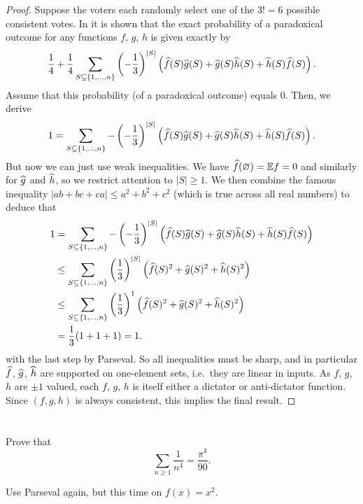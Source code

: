 \begin{proof}
	Suppose the voters each randomly select one of the $3!=6$
	possible consistent votes.
	In  it is shown
	that the exact probability of a paradoxical outcome
	for any functions $f$, $g$, $h$ is given exactly by
	\[ \frac14 + \frac14 \sum_{S \subseteq \{1, \dots, n\}}
		\left( -\frac13 \right)^{\left\lvert S \right\rvert}
		\left( \widehat f(S) \widehat g(S) + \widehat g(S) \widehat h(S) + \widehat h(S) \widehat f(S) \right).
		\]
	Assume that this probability (of a paradoxical outcome) equals $0$.
	Then, we derive
	\[ 1 = \sum_{S \subseteq \{1, \dots, n\}}
		-\left( -\frac13 \right)^{\left\lvert S \right\rvert}
		\left( \widehat f(S) \widehat g(S) + \widehat g(S) \widehat h(S) + \widehat h(S) \widehat f(S) \right). \]
	But now we can just use weak inequalities.
	We have $\widehat f(\varnothing) = \mathbb E f = 0$ and similarly for $\widehat g$ and $\widehat h$,
	so we restrict attention to $|S| \ge 1$.
	We then combine the famous inequality $|ab+bc+ca| \le a^2+b^2+c^2$
	(which is true across all real numbers) to deduce that
	\begin{align*}
		1 &= \sum_{S \subseteq \{1, \dots, n\}}
		-\left( -\frac13 \right)^{\left\lvert S \right\rvert}
		\left( \widehat f(S) \widehat g(S) + \widehat g(S) \widehat h(S) + \widehat h(S) \widehat f(S) \right) \\
		&\le \sum_{S \subseteq \{1, \dots, n\}}
		\left( \frac13 \right)^{\left\lvert S \right\rvert}
		\left( \widehat f(S)^2 + \widehat g(S)^2 + \widehat h(S)^2 \right) \\
		&\le \sum_{S \subseteq \{1, \dots, n\}} \left( \frac13 \right)^1
		\left( \widehat f(S)^2 + \widehat g(S)^2 + \widehat h(S)^2 \right) \\
		&= \frac13 (1+1+1) = 1.
	\end{align*}
	with the last step by Parseval.
	So all inequalities must be sharp, and in particular $\widehat f$, $\widehat g$, $\widehat h$
	are supported on one-element sets, i.e.\ they are linear in inputs.
	As $f$, $g$, $h$ are $\pm 1$ valued, each $f$, $g$, $h$ is itself
	either a dictator or anti-dictator function.
	Since $(f,g,h)$ is always consistent, this implies the final result.
\end{proof}


\section{\problemhead}

\begin{problem}
	Prove that
	\[ \sum_{n \ge 1} \frac{1}{n^4} = \frac{\pi^4}{90}. \]
	\begin{hint}
		Use Parseval again, but this time on $f(x) = x^2$.
	\end{hint}
\end{problem}

